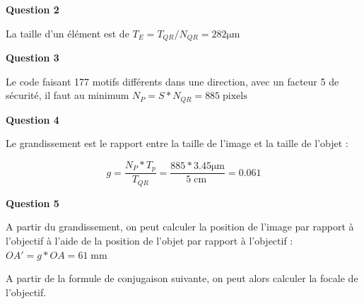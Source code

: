 \documentclass[a4paper,11pt,twoside]{book} %
\begin{document}
\begin{center}
\end{center}


\medskip
\textbf{Question 2}

La taille d'un élément est de $T_E = T_{QR} / N_{QR} = 282 \operatorname{\mu{}m}$


\medskip
\textbf{Question 3}

Le code faisant 177 motifs différents dans une direction, avec un facteur 5 de sécurité, il faut au minimum $N_P = S * N_{QR} = 885\operatorname{pixels}$ 


\medskip
\textbf{Question 4}

Le grandissement est le rapport entre la taille de l'image et la taille de l'objet : 

$$g = \frac{N_P * T_p}{T_{QR}} = \frac{885 * 3.45\operatorname{\mu{}m}}{5\operatorname{cm}} = 0.061$$


\medskip
\textbf{Question 5}

A partir du grandissement, on peut calculer la position de l'image par rapport à l'objectif à l'aide de la position de l'objet par rapport à l'objectif :  $OA' = g * OA = 61\operatorname{mm}$

\medskip

A partir de la formule de conjugaison suivante, on peut alors calculer la focale de l'objectif.
\end{document}
